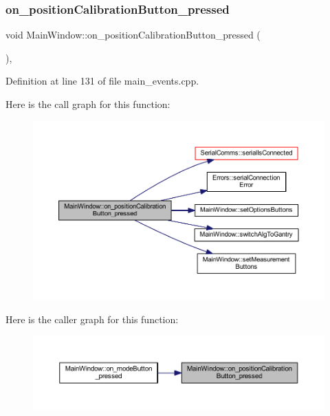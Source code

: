 \subsubsection{\texorpdfstring{on\_positionCalibrationButton\_pressed}{on\_positionCalibrationButton\_pressed}}
{\footnotesize\ttfamily void Main\+Window\+::on\+\_\+position\+Calibration\+Button\+\_\+pressed (\begin{DoxyParamCaption}{ }\end{DoxyParamCaption})\hspace{0.3cm}{\ttfamily [private]}, {\ttfamily [slot]}}



Definition at line 131 of file main\+\_\+events.\+cpp.

Here is the call graph for this function\+:
\nopagebreak
\begin{figure}[H]
\begin{center}
\leavevmode
\includegraphics[width=350pt]{classMainWindow_ad8b394c839532c8b74fb8c7602d3da89_cgraph}
\end{center}
\end{figure}
Here is the caller graph for this function\+:
\nopagebreak
\begin{figure}[H]
\begin{center}
\leavevmode
\includegraphics[width=350pt]{classMainWindow_ad8b394c839532c8b74fb8c7602d3da89_icgraph}
\end{center}
\end{figure}
\mbox{\label{classMainWindow_a125980000dd5d0e94dfc612b0d911267}} 
